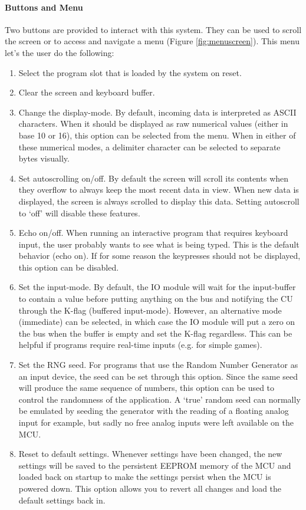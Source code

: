 \paragraph{Buttons and Menu} Two buttons are provided to interact with this system. They can be used to scroll the screen or to access and navigate a menu (Figure \ref{fig:menuscreen}). This menu let's the user do the following:
\begin{enumerate}
\item Select the program slot that is loaded by the system on reset.
\item Clear the screen and keyboard buffer.
\item Change the display-mode. By default, incoming data is interpreted as ASCII characters. When it should be displayed as raw numerical values (either in base 10 or 16), this option can be selected from the menu. When in either of these numerical modes, a delimiter character can be selected to separate bytes visually.
\item Set autoscrolling on/off. By default the screen will scroll its contents when they overflow to always keep the most recent data in view. When new data is displayed, the screen is always scrolled to display this data. Setting autoscroll to `off' will disable these features.
\item Echo on/off. When running an interactive program that requires keyboard input, the user probably wants to see what is being typed. This is the default behavior (echo on). If for some reason the keypresses should not be displayed, this option can be disabled.
\item Set the input-mode. By default, the IO module will wait for the input-buffer to contain a value before putting anything on the bus and notifying the CU through the K-flag (buffered input-mode). However, an alternative mode (immediate) can be selected, in which case the IO module will put a zero on the bus when the buffer is empty and set the K-flag regardless. This can be helpful if programs require real-time inputs (e.g. for simple games).
\item Set the RNG seed. For programs that use the Random Number Generator as an input device, the seed can be set through this option. Since the same seed will produce the same sequence of numbers, this option can be used to control the randomness of the application. A `true' random seed can normally be emulated by seeding the generator with the reading of a floating analog input for example, but sadly no free analog inputs were left available on the MCU.
\item Reset to default settings. Whenever settings have been changed, the new settings will be saved to the persistent EEPROM memory of the MCU and loaded back on startup to make the settings persist when the MCU is powered down. This option allows you to revert all changes and load the default settings back in.
\end{enumerate}

